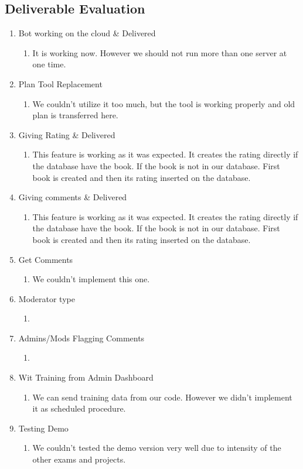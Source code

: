 \documentclass[a4paper]{article}
\begin{document}
\subsection{Deliverable Evaluation}
\begin{enumerate}
\item Bot working on the cloud \& Delivered 
\begin{enumerate}
  \item It is working now. However we should not run more than one server at one time.
   \end{enumerate}
   \item Plan Tool Replacement
   \begin{enumerate}
    \item We couldn't utilize it too much, but the tool is working properly and old plan is transferred here.
     \end{enumerate}
   \item Giving Rating \& Delivered \\
   \begin{enumerate}
    \item This feature is working as it was expected. It creates the rating directly if the database have the book. If the book is not in our database. First book is created and then its rating inserted on the database.
   \end{enumerate}
   \item Giving comments \& Delivered \\
   \begin{enumerate}
   \item This feature is working as it was expected. It creates the rating directly if the database have the book. If the book is not in our database. First book is created and then its rating inserted on the database.
 	\end{enumerate}
 	\item 	Get Comments
 	\begin{enumerate}
 \item We couldn't implement this one.
 	\end{enumerate}
 	\item 	Moderator type
 	\begin{enumerate}
 	\item
 	\end{enumerate}
 	\item 	Admins/Mods Flagging Comments
 	\begin{enumerate}
 \item  
 	\end{enumerate}
 	\item	Wit Training from Admin Dashboard
 	\begin{enumerate}
 \item	We can send training data from our code. However we didn't implement it as scheduled procedure.
 		\end{enumerate}
  \item	Testing Demo
    \begin{enumerate}
 	  \item  We couldn't tested the demo version very well due to intensity of the other exams and projects.
 	 \end{enumerate}
 \end{enumerate}
\end{document}
